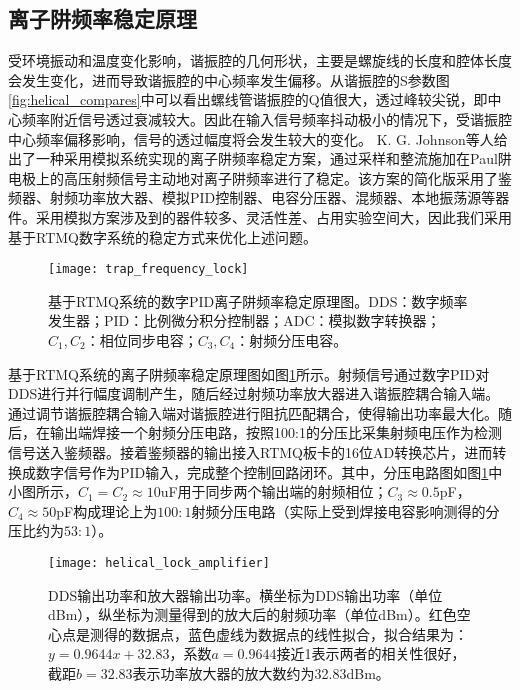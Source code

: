 \subsection[离子阱频率稳定原理和系统搭建]{离子阱频率稳定原理}


受环境振动和温度变化影响，谐振腔的几何形状，主要是螺旋线的长度和腔体长度会发生变化，进而导致谐振腔的中心频率发生偏移。从谐振腔的S参数图\ref{fig:helical_compares}中可以看出螺线管谐振腔的Q值很大，透过峰较尖锐，即中心频率附近信号透过衰减较大。因此在输入信号频率抖动极小的情况下，受谐振腔中心频率偏移影响，信号的透过幅度将会发生较大的变化。
K. G. Johnson等人\cite[]{Johnson_Wong_Campos_Restelli_Landsman_Neyenhuis_Mizrahi_Monroe_2016}给出了一种采用模拟系统实现的离子阱频率稳定方案，通过采样和整流施加在Paul阱电极上的高压射频信号主动地对离子阱频率进行了稳定。该方案的简化版采用了鉴频器、射频功率放大器、模拟PID控制器、电容分压器、混频器、本地振荡源等器件。采用模拟方案涉及到的器件较多、灵活性差、占用实验空间大，因此我们采用基于RTMQ数字系统的稳定方式来优化上述问题。

\begin{figure}
    \centering
    \caption[基于RTMQ系统的数字PID离子阱频率稳定原理图]{基于RTMQ系统的数字PID离子阱频率稳定原理图。DDS：数字频率发生器；PID：比例微分积分控制器；ADC：模拟数字转换器；$C_1,C_2$：相位同步电容；$C_3,C_4$：射频分压电容。\label{fig:trap_frequency_lock}}
    \texttt{[image: trap\_frequency\_lock]}
\end{figure}


基于RTMQ系统的离子阱频率稳定原理图如图\ref{fig:trap_frequency_lock}所示。射频信号通过数字PID对DDS进行并行幅度调制产生，随后经过射频功率放大器进入谐振腔耦合输入端。通过调节谐振腔耦合输入端对谐振腔进行阻抗匹配耦合，使得输出功率最大化。随后，在输出端焊接一个射频分压电路，按照100:1的分压比采集射频电压作为检测信号送入鉴频器。接着鉴频器的输出接入RTMQ板卡的16位AD转换芯片，进而转换成数字信号作为PID输入，完成整个控制回路闭环。其中，分压电路图如图\ref{fig:trap_frequency_lock}中小图所示，$C_1=C_2\approx10$uF用于同步两个输出端的射频相位；$C_3\approx0.5$pF，$C_4\approx50$pF构成理论上为$100:1$射频分压电路（实际上受到焊接电容影响测得的分压比约为$53:1$）。

\begin{figure}
    \centering
    \caption[DDS输出功率和放大器输出功率]{DDS输出功率和放大器输出功率。横坐标为DDS输出功率（单位dBm），纵坐标为测量得到的放大后的射频功率（单位dBm）。红色空心点是测得的数据点，蓝色虚线为数据点的线性拟合，拟合结果为：$y=0.9644x+32.83$，系数$a=0.9644$接近1表示两者的相关性很好，截距$b=32.83$表示功率放大器的放大数约为32.83dBm。\label{fig:helical_lock_amplifier}}
    \texttt{[image: helical\_lock\_amplifier]}
\end{figure}


